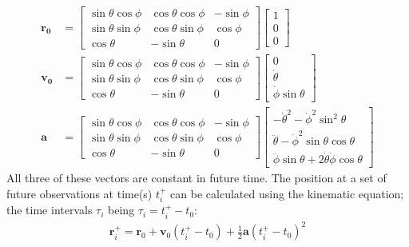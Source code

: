\documentclass[letterpaper,11pt,english]{sphinxmanual}
\begin{document}
\begin{equation*}
\begin{split}\mathbf{r_0} &= \begin{bmatrix}
\sin\theta\cos\phi & \cos\theta\cos\phi & -\sin\phi \\
\sin\theta\sin\phi & \cos\theta\sin\phi &  \cos\phi \\
\cos\theta         & -\sin\theta        & 0
\end{bmatrix} \begin{bmatrix} 1 \\ 0 \\ 0 \end{bmatrix} \\
\mathbf{v_0} &= \begin{bmatrix}
\sin\theta\cos\phi & \cos\theta\cos\phi & -\sin\phi \\
\sin\theta\sin\phi & \cos\theta\sin\phi &  \cos\phi \\
\cos\theta         & -\sin\theta        & 0
\end{bmatrix} \begin{bmatrix} 0 \\ \dot\theta \\ \dot\phi \sin\theta \end{bmatrix} \\
\mathbf{a} &= \begin{bmatrix}
\sin\theta\cos\phi & \cos\theta\cos\phi & -\sin\phi \\
\sin\theta\sin\phi & \cos\theta\sin\phi &  \cos\phi \\
\cos\theta         & -\sin\theta        & 0
\end{bmatrix} \begin{bmatrix} -\dot\theta^2 - \dot\phi^2\sin^2\theta \\ \ddot\theta - \dot\phi^2\sin\theta\cos\theta \\ \ddot\phi\sin\theta  + 2 \dot\theta\dot\phi\cos\theta \end{bmatrix}\end{split}
\end{equation*}
\sphinxAtStartPar
All three of these vectors are constant in future time. The position at a
set of future observations at time(s) \(t^+_i\) can be calculated using
the kinematic equation; the time intervals \(\tau_i\) being
\(\tau_i = t^+_i - t_0\):
\begin{equation*}
\begin{split}\mathbf{r}^+_i = \mathbf{r}_0 + \mathbf{v}_0 \left(t^+_i - t_0\right) + \frac{1}{2} \mathbf{a} \left(t^+_i - t_0\right)^2\end{split}
\end{equation*}
\end{document}
